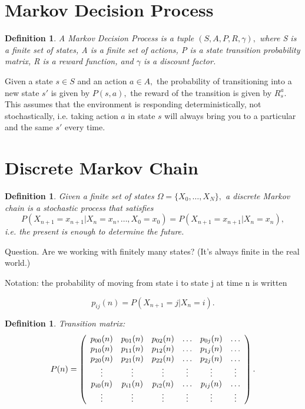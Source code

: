 \documentclass[17pt]{extarticle}
\theoremstyle{plain}
\newtheorem{definition}[theorem]{Definition}
\theoremstyle{definition}
\theoremstyle{remark}
\newcommand{\0}{\varnothing}
\newcommand{\<}{\langle}
\renewcommand{\>}{\rangle}
\begin{document}
\section{Markov Decision Process}

\begin{definition}
  A Markov Decision Process is a tuple \( (S, A, P, R, \gamma), \) where S is a finite set of states, A is a finite set of actions, P is a state transition probability matrix, R is a reward function, and \( \gamma \) is a discount factor.
\end{definition}

Given a state \( s \in S \) and an action \( a \in A, \) the probability of
transitioning into a new state \( s' \) is given by \( P(s, a), \) the reward of
the transition is given by \( R_s^a. \) This assumes that the environment is
responding deterministically, not stochastically, i.e. taking action \( a \) in
state \( s \) will always bring you to a particular and the same \( s' \) every
time.

\section{Discrete Markov Chain}

\begin{definition}
  Given a finite set of states \( \Omega = \{ X_0, \ldots, X_N \}, \) a discrete Markov chain is a stochastic process that satisfies
\[
P \left( X _ { n + 1 } = x _ { n + 1 } | X _ { n } = x _ { n } , \ldots , X _ { 0 } = x _ { 0 } \right) = P \left( X _ { n + 1 } = x _ { n + 1 } | X _ { n } = x _ { n } \right),
\]
i.e. the present is enough to determine the future.
\end{definition}

Question. Are we working with finitely many states? (It's always finite in the real world.)

Notation: the probability of moving from state i to state j at time n is written

\[
p _ { i j } ( n ) = P \left( X _ { n + 1 } = j | X _ { n } = i \right).
\]

\begin{definition}
Transition matrix:
\[
P ( n ) = \left(
\begin{array}{ c c c c c c }
{ p _ { 00 } ( n ) } & { p _ { 01 } ( n ) } & { p _ { 02 } ( n ) } & { \dots } & { p _ { 0 j } ( n ) } & { \dots } \\
{ p _ { 10 } ( n ) } & { p _ { 11 } ( n ) } & { p _ { 12 } ( n ) } & { \dots } & { p _ { 1 j } ( n ) } & { \dots } \\
{ p _ { 20 } ( n ) } & { p _ { 21 } ( n ) } & { p _ { 22 } ( n ) } & { \dots } & { p _ { 2 j } ( n ) } & { \dots } \\
{ \vdots } & { \vdots } & { \vdots } & { \vdots } & { \vdots } & { \vdots } \\
{ p _ { i 0 } ( n ) } & { p _ { i 1 } ( n ) } & { p _ { i 2 } ( n ) } & { \dots } & { p _ { i j } ( n ) } & { \dots } \\
{ \vdots } & { \vdots } & { \vdots } & { \vdots } & { \vdots } & { \vdots }
\end{array}
\right).
\]
\end{definition}
\end{document}
